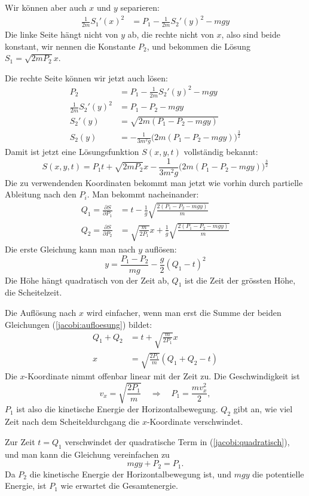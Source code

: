 Wir können aber auch $x$ und $y$ separieren:
\begin{align*}
\frac1{2m}S_1'(x)^2&=P_1-\frac1{2m}S_2'(y)^2-mgy
\end{align*}
Die linke Seite hängt nicht von $y$ ab, die rechte nicht von $x$, also sind
beide konstant, wir nennen die Konstante $P_2$, und bekommen
die Lösung $S_1=\sqrt{2mP_2} x$.

Die rechte Seite können wir jetzt auch lösen:
\begin{align*}
P_2&=
P_1-\frac1{2m}S_2'(y)^2-mgy
\\
\frac1{2m}S_2'(y)^2
&=
P_1-P_2-mgy
\\
S_2'(y)&=\sqrt{
2m(P_1-P_2-mgy)
}
\\
S_2(y)
&=
-\frac1{3m^2g}\bigl(2m(P_1-P_2-mgy)\bigr)^{\frac32}
\end{align*}
Damit ist jetzt eine Lösungsfunktion $S(x,y,t)$ vollständig
bekannt:
\[
S(x,y,t)=P_1t+\sqrt{2mP_2}x
-
\frac1{3m^2g}\bigl(2m(P_1-P_2-mgy)\bigr)^{\frac32}
\]
Die zu verwendenden Koordinaten bekommt man jetzt wie vorhin durch
partielle Ableitung nach den $P_i$. Man bekommt nacheinander:
\begin{equation}
\begin{aligned}
Q_1=\frac{\partial S}{\partial P_1}
&=
t-
\frac1{g}\sqrt{\frac{2(P_1-P_2-mgy)}{m}}
\\
Q_2=\frac{\partial S}{\partial P_2}
&=
\sqrt{\frac{m}{2P_1}}x
+
\frac1{g}\sqrt{\frac{2(P_1-P_2-mgy)}{m}}
\end{aligned}
\label{jacobi:aufloesung}
\end{equation}
Die erste Gleichung kann man nach $y$ auflösen:
\begin{equation}
y=
\frac{P_1-P_2}{mg}-\frac{g}{2}(Q_1-t)^2
\label{jacobi:quadratisch}
\end{equation}
Die Höhe hängt quadratisch von der Zeit ab, $Q_1$ ist die Zeit
der grössten Höhe, die Scheitelzeit.

Die Auflösung nach $x$ wird einfacher, wenn man erst die Summe der beiden
Gleichungen (\ref{jacobi:aufloesung}) bildet:
\begin{align*}
Q_1+Q_2&=t+\sqrt{\frac{m}{2P_1}}x\\
x&=\sqrt{\frac{2P_1}{m}}(Q_1+Q_2-t)
\end{align*}
Die $x$-Koordinate nimmt offenbar linear mit der Zeit zu. Die
Geschwindigkeit ist
\[
v_x=\sqrt{\frac{2P_1}{m}}\quad\Rightarrow\quad P_1=\frac{mv_x^2}2,
\]
$P_1$ ist also die kinetische Energie der Horizontalbewegung.
$Q_2$ gibt an, wie viel Zeit nach dem Scheiteldurchgang die $x$-Koordinate
verschwindet.

Zur Zeit $t=Q_1$ verschwindet der quadratische Term in
(\ref{jacobi:quadratisch}), und man kann die Gleichung vereinfachen
zu 
\[
mgy + P_2=P_1.
\]
Da $P_2$ die kinetische Energie der Horizontalbewegung ist, und $mgy$
die potentielle Energie, ist $P_1$ wie erwartet die Gesamtenergie.

